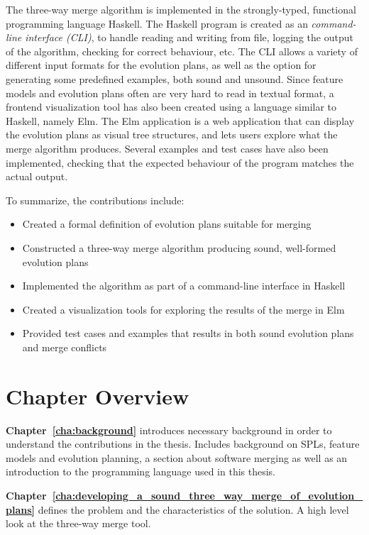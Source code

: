 \documentclass[a4paper,english]{ifimaster}
\begin{document}
The three-way merge algorithm is implemented in the strongly-typed, functional programming language Haskell. The Haskell program is created as an \textit{command-line interface (CLI)}, to handle reading and writing from file, logging the output of the algorithm, checking for correct behaviour, etc. The CLI allows a variety of different input formats for the evolution plans, as well as the option for generating some predefined examples, both sound and unsound. Since feature models and evolution plans often are very hard to read in textual format, a frontend visualization tool has also been created using a language similar to Haskell, namely Elm. The Elm application is a web application that can display the evolution plans as visual tree structures, and lets users explore what the merge algorithm produces. Several examples and test cases have also been implemented, checking that the expected behaviour of the program matches the actual output.

To summarize, the contributions include:

\begin{itemize}
  \item Created a formal definition of evolution plans suitable for merging
  \item Constructed a three-way merge algorithm producing sound, well-formed evolution plans
  \item Implemented the algorithm as part of a command-line interface in Haskell
  \item Created a visualization tools for exploring the results of the merge in Elm
  \item Provided test cases and examples that results in both sound evolution plans and merge conflicts
\end{itemize}

\section{Chapter Overview}%
\label{sec:chapter_overview}

\textbf{Chapter~\ref{cha:background}} introduces necessary background in order to understand the contributions in the thesis. Includes background on SPLs, feature models and evolution planning, a section about software merging as well as an introduction to the programming language used in this thesis.

\textbf{Chapter~\ref{cha:developing_a_sound_three_way_merge_of_evolution_plans}} defines the problem and the characteristics of the solution. A high level look at the three-way merge tool.
\end{document}
